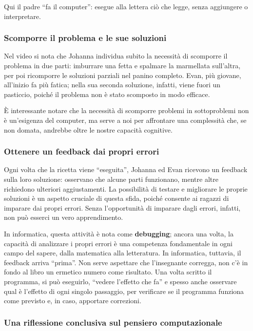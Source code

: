 Qui il padre ``fa il computer'': esegue alla lettera ciò che legge, senza aggiungere o interpretare.


\subsubsection{Scomporre il problema e le sue soluzioni}


Nel video si nota che Johanna individua subito la necessità di scomporre il problema in due parti: imburrare una fetta e spalmare la marmellata sull'altra, per poi ricomporre le soluzioni parziali nel panino completo. Evan, più giovane, all'inizio fa più fatica; nella sua seconda soluzione, infatti, viene fuori un pasticcio, poiché il problema non è stato scomposto in modo efficace.

È interessante notare che la necessità di scomporre problemi in sottoproblemi non è un'esigenza del computer, ma serve a noi per affrontare una complessità che, se non domata, andrebbe oltre le nostre capacità cognitive.


\subsubsection{Ottenere un feedback dai propri errori}


Ogni volta che la ricetta viene ``eseguita'', Johanna ed Evan ricevono un feedback sulla loro soluzione: osservano che alcune parti funzionano, mentre altre richiedono ulteriori aggiustamenti. La possibilità di testare e migliorare le proprie soluzioni è un aspetto cruciale di questa sfida, poiché consente ai ragazzi di imparare dai propri errori. Senza l'opportunità di imparare dagli errori, infatti, non può esserci un vero apprendimento.

In informatica, questa attività è nota come \textbf{debugging}; ancora una volta, la capacità di analizzare i propri errori è una competenza fondamentale in ogni campo del sapere, dalla matematica alla letteratura. In informatica, tuttavia, il feedback arriva ``prima''. Non serve aspettare che l'insegnante corregga, non c'è in fondo al libro un ermetico numero come risultato. Una volta scritto il programma, si può eseguirlo, ``vedere l'effetto che fa'' e spesso anche osservare qual è l'effetto di ogni singolo passaggio, per verificare se il programma funziona come previsto e, in caso, apportare correzioni.

\subsubsection{Una riflessione conclusiva sul pensiero computazionale}

